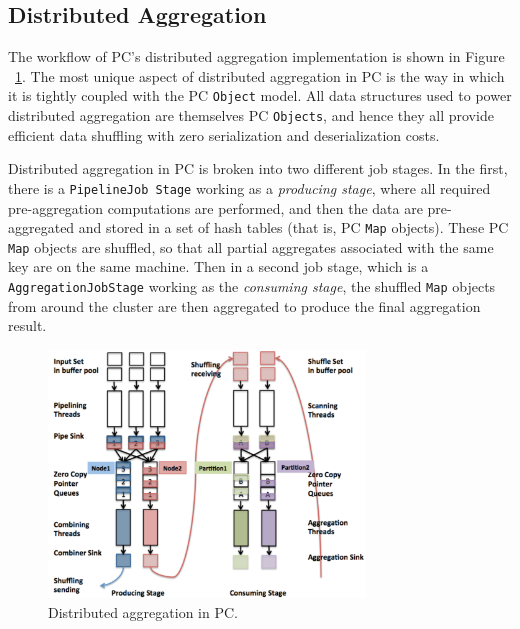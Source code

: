 \subsection{Distributed Aggregation}

The workflow of PC's distributed aggregation implementation is
shown in Figure ~\ref{fig:aggregation}.
The most unique aspect of distributed aggregation in PC is the way in which it is tightly coupled with the PC \texttt{Object} model.  All data structures used
to power distributed aggregation are themselves PC \texttt{Objects},
and hence they all provide efficient data shuffling with zero
serialization and deserialization costs.

Distributed aggregation in PC is broken into two different job stages.
In the first, there is a \texttt{PipelineJob Stage} working as a \emph{producing stage},
where all required pre-aggregation computations are performed, and then the
data are pre-aggregated and stored in a set of hash tables (that is, PC \texttt{Map} objects).  These PC \texttt{Map} objects are shuffled, so that all partial aggregates
associated with the same key are on the same machine.  Then in a
second job stage, which is a \texttt{AggregationJobStage} working as the \emph{consuming stage},
the shuffled \texttt{Map} objects from around the cluster are then aggregated
to produce the final aggregation result.

\begin{figure}
\centering
\includegraphics[width=0.75\textwidth]{aggregation.pdf}
  \caption{\label{fig:aggregation} Distributed aggregation in PC.}
\end{figure}

